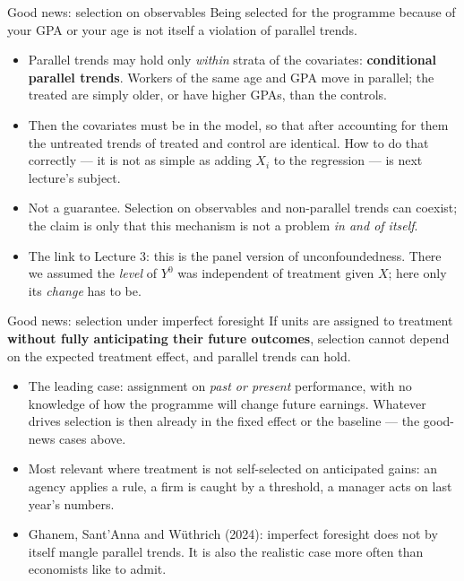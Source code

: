 \documentclass[
  11pt,
  ignorenonframetext,
  aspectratio=169,
]{beamer}
\providecommand{\tightlist}{%
  \setlength{\itemsep}{0pt}\setlength{\parskip}{0pt}}
\begin{document}
\begin{frame}{Good news: selection on observables}
\protect{}\label{good-news-selection-on-observables}
Being selected for the programme because of your GPA or your age is not
itself a violation of parallel trends.

\begin{itemize}
\tightlist
\item
  Parallel trends may hold only \emph{within} strata of the covariates:
  \textbf{conditional parallel trends}. Workers of the same age and GPA
  move in parallel; the treated are simply older, or have higher GPAs,
  than the controls.
\item
  Then the covariates must be in the model, so that after accounting for
  them the untreated trends of treated and control are identical. How to
  do that correctly --- it is not as simple as adding \(X_i\) to the
  regression --- is next lecture's subject.
\item
  Not a guarantee. Selection on observables and non-parallel trends can
  coexist; the claim is only that this mechanism is not a problem
  \emph{in and of itself}.
\end{itemize}

\vspace{0.3em}

\begin{itemize}
\tightlist
\item
  The link to Lecture 3: this is the panel version of unconfoundedness.
  There we assumed the \emph{level} of \(Y^0\) was independent of
  treatment given \(X\); here only its \emph{change} has to be.
\end{itemize}
\end{frame}

\begin{frame}{Good news: selection under imperfect foresight}
\protect{}\label{good-news-selection-under-imperfect-foresight}
If units are assigned to treatment \textbf{without fully anticipating
their future outcomes}, selection cannot depend on the expected
treatment effect, and parallel trends can hold.

\begin{itemize}
\tightlist
\item
  The leading case: assignment on \emph{past or present} performance,
  with no knowledge of how the programme will change future earnings.
  Whatever drives selection is then already in the fixed effect or the
  baseline --- the good-news cases above.
\item
  Most relevant where treatment is not self-selected on anticipated
  gains: an agency applies a rule, a firm is caught by a threshold, a
  manager acts on last year's numbers.
\item
  Ghanem, Sant'Anna and Wüthrich (2024): imperfect foresight does not by
  itself mangle parallel trends. It is also the realistic case more
  often than economists like to admit.
\end{itemize}
\end{frame}
\end{document}
